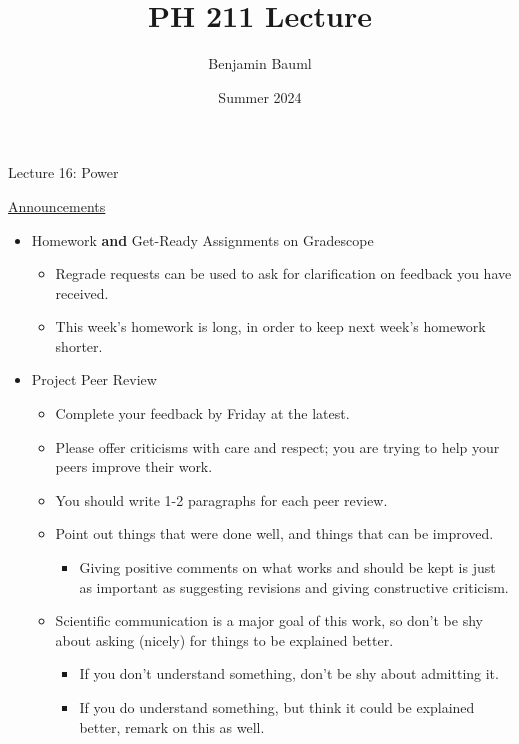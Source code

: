 \documentclass[]{article}
\title{PH 211 Lecture \Week}
\author{Benjamin Bauml}
\date{Summer 2024}
\newcommand{\Week}{16}
\begin{document}
\begin{TeacherMargin}

\end{TeacherMargin}
\begin{PresentSpace}
\begin{center}
	\huge Lecture \Week: Power
\end{center}
\vspace{0.5cm}
\underline{Announcements}
\begin{itemize}
	\item Homework \textbf{and} Get-Ready Assignments on Gradescope
	\begin{itemize}
		\item Regrade requests can be used to ask for clarification on feedback you have received.
		\item This week's homework is long, in order to keep next week's homework shorter.
	\end{itemize}
	\item Project Peer Review
	\begin{itemize}
		\item Complete your feedback by Friday at the latest.
		\item Please offer criticisms with care and respect; you are trying to help your peers improve their work.
		\item You should write 1-2 paragraphs for each peer review.
		\item Point out things that were done well, and things that can be improved.
		\begin{itemize}
			\item Giving positive comments on what works and should be kept is just as important as suggesting revisions and giving constructive criticism.
		\end{itemize}
		\item Scientific communication is a major goal of this work, so don't be shy about asking (nicely) for things to be explained better.
		\begin{itemize}
			\item If you don't understand something, don't be shy about admitting it.
			\item If you do understand something, but think it could be explained better, remark on this as well.
		\end{itemize}
	\end{itemize}
\end{itemize}
\end{PresentSpace}
\newpage
\begin{TeacherMargin}

\end{TeacherMargin}
\end{document}
